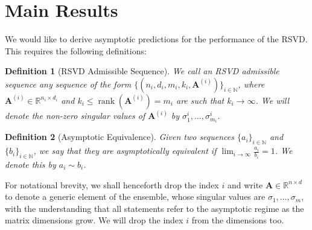 \documentclass[conference]{IEEEtran}
\newcommand{\rk}[1]{\operatorname{rank}(#1)}
\newcommand{\bA}{\mathbf{A}}
\newcommand{\bbR}{\mathbb{R}}
\newcommand{\calP}{\mathcal{P}}
\newtheorem{definition}{Definition}
\begin{document}


\section{Main Results}

We would like to derive asymptotic predictions for the performance of the RSVD. This requires the following definitions: 




\begin{definition}[RSVD Admissible Sequence]
    We call an {\it RSVD admissible sequence} any sequence of the form $\{(n_i, d_i, m_i, k_i, \bA^{(i)})\}_{i \in \mathbb{N}}$, where $\bA^{(i)} \in \bbR^{n_i \times d_i}$ and $k_i \le \rk{\bA^{(i)}} = m_i$ are such that $k_i \to \infty$. We will denote the non-zero singular values of $\bA^{(i)}$ by $\sigma_1^{{i}}, \dots, \sigma_{m_i}^{{i}}$. 
\end{definition}

\begin{definition}[Asymptotic Equivalence]
    Given two sequences $\{a_i\}_{i \in \mathbb{N}}$ and $\{b_i\}_{i \in \mathbb{N}}$, we say that they are asymptotically equivalent if $\lim_{i \to \infty} \frac{a_i}{b_i} = 1$. We denote this by $a_i \sim b_i$. 
\end{definition}

\noindent For notational brevity, we shall henceforth drop the index $i$ and write $\bA \in \mathbb{R}^{n \times d}$ to denote a generic element of the ensemble, whose singular values are $\sigma_1, \dots, \sigma_m$, with the understanding that all statements refer to the asymptotic regime as the matrix dimensions grow. We will drop the index $i$ from the dimensions too. 
\end{document}
